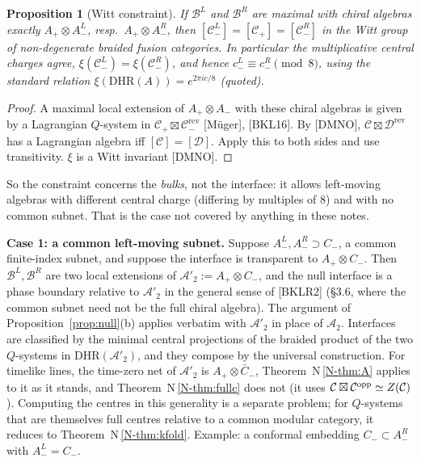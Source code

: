 \documentclass[11pt]{article}
\newtheorem{proposition}[theorem]{Proposition}
\theoremstyle{definition}
\theoremstyle{remark}
\newcommand{\cA}{\mathcal A}
\newcommand{\cB}{\mathcal B}
\newcommand{\nref}[1]{N\,\ref{N-#1}}
\begin{document}
\begin{proposition}[Witt constraint]\label{prop:witt}
If $\cB^L$ and $\cB^R$ are maximal with chiral algebras exactly $A_+\otimes A^L_-$, resp.\ $A_+\otimes A^R_-$, then $[\mathcal C^L_-]=[\mathcal C_+]=[\mathcal C^R_-]$ in the Witt group of non-degenerate braided fusion categories. In particular the multiplicative central charges agree, $\xi(\mathcal C^L_-)=\xi(\mathcal C^R_-)$, and hence $c^L_-\equiv c^R_-\pmod 8$, using the standard relation $\xi(\mathrm{DHR}(A))=e^{2\pi ic/8}$ (quoted).
\end{proposition}
\begin{proof}
A maximal local extension of $A_+\otimes A_-$ with these chiral algebras is given by a Lagrangian $Q$-system in $\mathcal C_+\boxtimes\mathcal C_-^{\mathrm{rev}}$ [M\"uger], [BKL16]. By [DMNO], $\mathcal C\boxtimes\mathcal D^{\mathrm{rev}}$ has a Lagrangian algebra iff $[\mathcal C]=[\mathcal D]$. Apply this to both sides and use transitivity. $\xi$ is a Witt invariant [DMNO].
\end{proof}
So the constraint concerns the \emph{bulks}, not the interface: it allows left-moving algebras with different central charge (differing by multiples of $8$) and with no common subnet. That is the case not covered by anything in these notes.

\textbf{Case 1: a common left-moving subnet.} Suppose $A^L_-,A^R_-\supset C_-$, a common finite-index subnet, and suppose the interface is transparent to $A_+\otimes C_-$. Then $\cB^L,\cB^R$ are two local extensions of $\cA'_2:=A_+\otimes C_-$, and the null interface is a phase boundary relative to $\cA'_2$ in the general sense of [BKLR2] (\S3.6, where the common subnet need not be the full chiral algebra). The argument of Proposition~\ref{prop:null}(b) applies verbatim with $\cA'_2$ in place of $\cA_2$. Interfaces are classified by the minimal central projections of the braided product of the two $Q$-systems in $\mathrm{DHR}(\cA'_2)$, and they compose by the universal construction. For timelike lines, the time-zero net of $\cA'_2$ is $A_+\otimes\bar C_-$, Theorem~\nref{thm:A} applies to it as it stands, and Theorem~\nref{thm:fullc} does not (it uses $\mathcal C\boxtimes\mathcal C^{\rm opp}\simeq Z(\mathcal C)$). Computing the centres in this generality is a separate problem; for $Q$-systems that are themselves full centres relative to a common modular category, it reduces to Theorem~\nref{thm:kfold}. Example: a conformal embedding $C_-\subset A^R_-$ with $A^L_-=C_-$.
\end{document}
